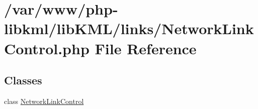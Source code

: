 \hypertarget{NetworkLinkControl_8php}{
\section{/var/www/php-\/libkml/libKML/links/NetworkLinkControl.php File Reference}
\label{d5/dbc/NetworkLinkControl_8php}
}
\subsection*{Classes}
\begin{DoxyCompactItemize}
\item 
class \hyperlink{classNetworkLinkControl}{NetworkLinkControl}
\end{DoxyCompactItemize}
